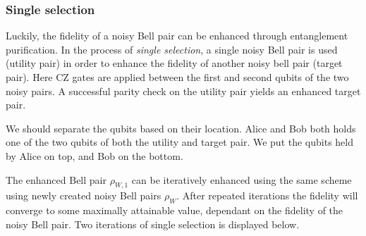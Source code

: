 \subsubsection*{Single selection}
Luckily, the fidelity of a noisy Bell pair can be enhanced through entanglement purification. In the process of \emph{single selection}, a single noisy Bell pair is used (utility pair) in order to enhance the fidelity of another noisy bell pair (target pair). Here CZ gates are applied between the first and second qubits of the two noisy pairs. A successful parity check on the utility pair yields an enhanced target pair.
\begin{center}
\end{center}

We should separate the qubits based on their location. Alice and Bob both holds one of the two qubits of both the utility and target pair. We put the qubits held by Alice on top, and Bob on the bottom.

\begin{center}
\end{center}

The enhanced Bell pair $\rho_{W,1}$ can be iteratively enhanced using the same scheme using newly created noisy Bell pairs $\rho_W$. After repeated iterations the fidelity will converge to some maximally attainable value, dependant on the fidelity of the noisy Bell pair. Two iterations of single selection is displayed below.

